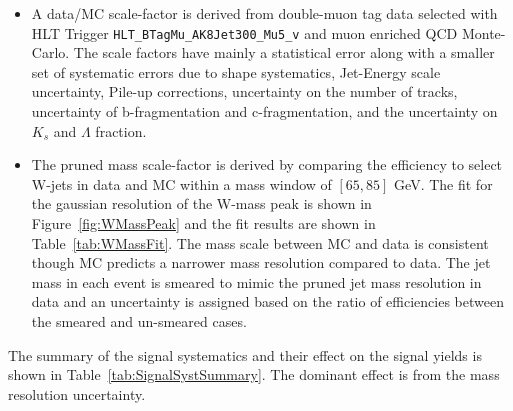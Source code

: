 \begin{itemize}
\item A data/MC scale-factor is derived from double-muon tag data selected with HLT Trigger \texttt{HLT\_BTagMu\_AK8Jet300\_Mu5\_v} and muon enriched QCD Monte-Carlo. The scale factors have mainly a statistical error along with a smaller set of systematic errors due to shape systematics, Jet-Energy scale uncertainty, Pile-up corrections, uncertainty on the number of tracks, uncertainty of b-fragmentation and  c-fragmentation, and the uncertainty on $K_{s}$ and $\Lambda$ fraction. 
\item The pruned mass scale-factor is derived by comparing the efficiency to select W-jets in data and MC within a mass window of $\left[65,85\right]$ GeV.  The fit for the gaussian resolution of the W-mass peak is shown in Figure~\ref{fig:WMassPeak} and the fit results are shown in Table~\ref{tab:WMassFit}. The mass scale between MC and data is consistent though MC predicts a narrower mass resolution compared to data. The jet mass in each event is smeared to mimic the pruned jet mass resolution in data and an uncertainty is assigned based on the ratio of efficiencies between the smeared and un-smeared cases. ~\cite{CMS_AN_2016-215}
\end{itemize} 

The summary of the signal systematics and their effect on the signal yields is shown in Table~\ref{tab:SignalSystSummary}. The dominant effect is from the mass resolution uncertainty.



